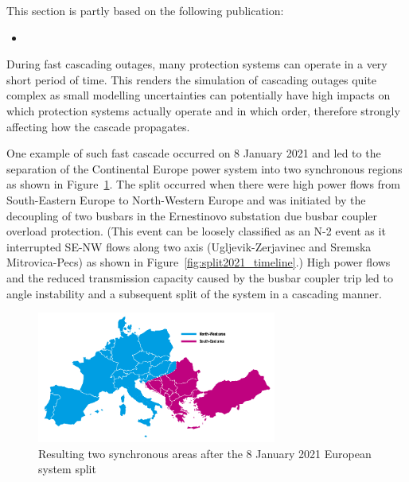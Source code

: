 \begin{tcolorbox}[width=\linewidth, sharp corners=all,
    colback=white!80!black,
    colframe=white!80!black]
This section is partly based on the following publication:
\begin{itemize}
    \item {}
\end{itemize}
\end{tcolorbox}

During fast cascading outages, many protection systems can operate in a very short period of time. This renders the simulation of cascading outages quite complex as small modelling uncertainties can potentially have high impacts on which protection systems actually operate and in which order, therefore strongly affecting how the cascade propagates.

One example of such fast cascade occurred on 8 January 2021 and led to the separation of the Continental Europe power system into two synchronous regions as shown in Figure~\ref{fig:split2021}. The split occurred when there were high power flows from South-Eastern Europe to North-Western Europe and was initiated by the decoupling of two busbars in the Ernestinovo substation due busbar coupler overload protection. (This event can be loosely classified as an N-2 event as it interrupted SE-NW flows along two axis (Ugljevik-Zerjavinec and Sremska Mitrovica-Pecs) as shown in Figure~\ref{fig:split2021_timeline}.) High power flows and the reduced transmission capacity caused by the busbar coupler trip led to angle instability and a subsequent split of the system in a cascading manner.

\begin{figure}
    \centering
    \includegraphics[width = 0.7\textwidth]{Figs/SystemSplit2021.pdf}
    \caption{Resulting two synchronous areas after the 8 January 2021 European system split~\cite{ENTSOESplitJan2021}}
    \label{fig:split2021}
\end{figure}

